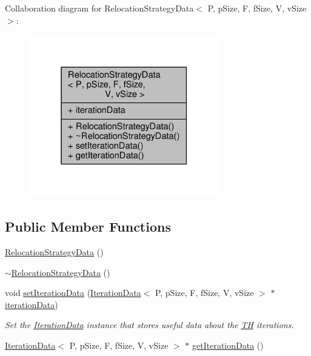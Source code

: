 Collaboration diagram for Relocation\+Strategy\+Data$<$ P, p\+Size, F, f\+Size, V, v\+Size $>$\+:\nopagebreak
\begin{figure}[H]
\begin{center}
\leavevmode
\includegraphics[width=235pt]{structRelocationStrategyData__coll__graph}
\end{center}
\end{figure}
\subsection*{Public Member Functions}
\begin{DoxyCompactItemize}
\item 
\hyperlink{structRelocationStrategyData_a71fd536ba8c523a79caf20c688f04951}{Relocation\+Strategy\+Data} ()
\item 
\hyperlink{structRelocationStrategyData_a59cbaaf8cc4b655bfed790e90d5ededa}{$\sim$\+Relocation\+Strategy\+Data} ()
\item 
void \hyperlink{structRelocationStrategyData_ac22ab7079cd4bc194d2a1143ce0766ae}{set\+Iteration\+Data} (\hyperlink{structIterationData}{Iteration\+Data}$<$ P, p\+Size, F, f\+Size, V, v\+Size $>$ $\ast$\hyperlink{structRelocationStrategyData_adacdd9bfa31c367ca0c5ac82b8d1d2e5}{iteration\+Data})
\begin{DoxyCompactList}\small\item\em Set the \hyperlink{structIterationData}{Iteration\+Data} instance that stores useful data about the \hyperlink{classTH}{TH} iterations. \end{DoxyCompactList}\item 
\hyperlink{structIterationData}{Iteration\+Data}$<$ P, p\+Size, F, f\+Size, V, v\+Size $>$ $\ast$ \hyperlink{structRelocationStrategyData_af0c8811e45456b184467bb9c499fa8d9}{get\+Iteration\+Data} ()
\end{DoxyCompactItemize}
